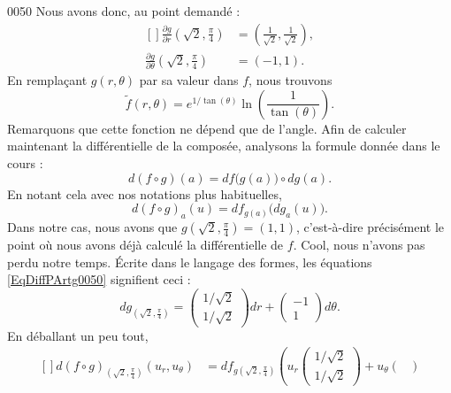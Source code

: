 \begin{corrige}{0050}
Nous avons donc, au point demandé :
\begin{equation}		\label{EqDiffPArtg0050}
	\begin{aligned}[]
		\frac{ \partial g }{ \partial r }(\sqrt{2},\frac{ \pi }{ 4 })	&=\left( \frac{1}{ \sqrt{2} },\frac{1}{ \sqrt{2} } \right),\\
		\frac{ \partial g }{ \partial \theta }(\sqrt{2},\frac{ \pi }{ 4 }) 	&=(-1,1).
	\end{aligned}
\end{equation}
En remplaçant $g(r,\theta)$ par sa valeur dans $f$, nous trouvons
\begin{equation}
	\tilde f(r,\theta)= e^{1/\tan(\theta)}\ln\left( \frac{1}{ \tan(\theta) } \right).
\end{equation}
Remarquons que cette fonction ne dépend que de l'angle. Afin de calculer maintenant la différentielle de la composée, analysons la formule donnée dans le cours :
\begin{equation}
	d(f\circ g)(a)=df\big( g(a) \big)\circ dg(a).
\end{equation}
En notant cela avec nos notations plus habituelles,
\begin{equation}
	d(f\circ g)_a(u)=df_{g(a)}\big( dg_a(u) \big).
\end{equation}
Dans notre cas, nous avons que $g(\sqrt{2},\frac{ \pi }{ 4 })=(1,1)$, c'est-à-dire précisément le point où nous avons déjà calculé la différentielle de $f$. Cool, nous n'avons pas perdu notre temps. Écrite dans le langage des formes, les équations \eqref{EqDiffPArtg0050} signifient ceci :
\begin{equation}
	dg_{(\sqrt{2},\frac{ \pi }{ 4 })}=\begin{pmatrix}
	1/\sqrt{2}	\\ 
	1/\sqrt{2}	
\end{pmatrix}dr+
\begin{pmatrix}
	-1	\\ 
	1	
\end{pmatrix}d\theta.
\end{equation}
En déballant un peu tout,
\begin{equation}
	\begin{aligned}[]
		d(f\circ g)_{(\sqrt{2},\frac{ \pi }{ 4 })}(u_r,u_{\theta})
					&=df_{g (\sqrt{2},\frac{ \pi }{ 4 }) }\left( 
		u_r\begin{pmatrix}
	1/\sqrt{2}	\\ 
	1/\sqrt{2}	
\end{pmatrix} +
u_{\theta}\begin{pmatrix}

\end{pmatrix}
\end{aligned}
\end{equation}
\end{corrige}
